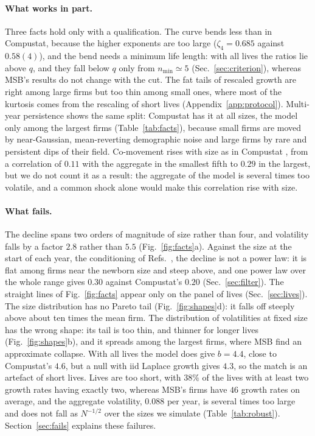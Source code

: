\documentclass[pre,twocolumn,superscriptaddress,nofootinbib]{revtex4-2}
\begin{document}
\paragraph{What works in part.}  Three facts hold only with a qualification.  The curve bends less than in
Compustat, because the higher exponents are too large ($\zeta_4=0.685$ against $0.58(4)$), and the bend needs a
minimum life length: with all lives the ratios lie above $q$, and they fall below $q$ only from $n_{\min}\simeq5$
(Sec.~\ref{sec:criterion}), whereas MSB's results do not change with the cut.  The fat tails of rescaled growth
are right among large firms but too thin among small ones, where most of the kurtosis comes from the rescaling of
short lives (Appendix~\ref{app:protocol}).  Multi-year persistence shows the same split: Compustat has it at all
sizes, the model only among the largest firms (Table~\ref{tab:facts}), because small firms are moved by
near-Gaussian, mean-reverting demographic noise and large firms by rare and persistent dips of their field.
Co-movement rises with size as in Compustat \cite{moran2024}, from a correlation of $0.11$ with the aggregate in the
smallest fifth to $0.29$ in the largest, but we do not count it as a result: the aggregate of the model is several
times too volatile, and a common shock alone would make this correlation rise with size.

\paragraph{What fails.}  The decline spans two orders of magnitude of size rather than four, and volatility falls by
a factor $2.8$ rather than $5.5$ (Fig.~\ref{fig:facts}a).  Against the size at the start of each year, the
conditioning of Refs.~\cite{stanley1996,amaral1997}, the decline is not a power law: it is flat among firms near
the newborn size and steep above, and one power law over the whole range gives $0.30$ against Compustat's $0.20$
(Sec.~\ref{sec:filter}).  The straight lines of Fig.~\ref{fig:facts} appear only on the panel of lives
(Sec.~\ref{sec:lives}).  The size distribution has no Pareto tail
(Fig.~\ref{fig:shapes}d): it falls off steeply above about ten times the mean firm.  The distribution of volatilities
at fixed size has the wrong shape: its tail is too thin, and thinner for longer lives (Fig.~\ref{fig:shapes}b), and
it spreads among the largest firms, where MSB find an approximate collapse.  With all lives the model does give
$b=4.4$, close to Compustat's $4.6$, but a null with iid Laplace growth gives $4.3$, so the match is an artefact of
short lives.  Lives are too short, with $38\%$ of the lives with at least two growth rates having exactly two,
whereas MSB's firms have $46$ growth rates on average, and the aggregate volatility, $0.088$ per year, is several
times too large and does not fall as $N^{-1/2}$ over the sizes we simulate (Table~\ref{tab:robust}).  Section~\ref{sec:fails}
explains these failures.
\end{document}
